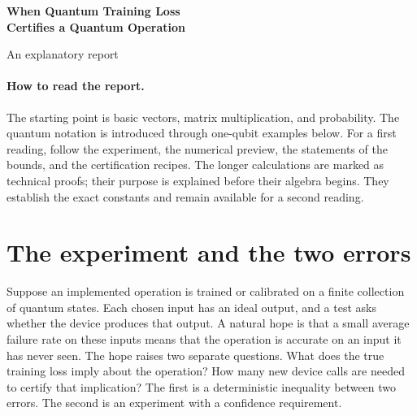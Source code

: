 \documentclass[11pt,a4paper]{article}
\numberwithin{equation}{section}
\begin{document}
\begin{center}
{\LARGE\bfseries\color{ink} When Quantum Training Loss\\[3pt] Certifies a Quantum Operation}\par
\vspace{5pt}
{\large An explanatory report}
\end{center}
\vspace{3pt}
\begin{abstract}
A suitable finite collection of test inputs can force a perfectly agreeing quantum channel to equal a unitary target. A small nonzero loss on those same inputs may nevertheless give a weak accuracy guarantee. The missing distinction is sensitivity to dissipative errors. This report develops a geometric criterion for when pure-state training loss controls average error linearly, derives its optimal coefficient, and explains the precision cost of menus that fail the criterion. The same geometry determines an optimal certification law even when the verifier chooses later probes adaptively and stores outputs in quantum memory. An independent-channel example makes the consequence explicit: adding a third global product input changes the required number of examples from order $n/\delta^2$ to order $1/\delta$, at fixed confidence, for an array of $n$ qubits and a requested average-error threshold $\delta$. Exact physical assumptions and the cost of each example remain part of the statement.
\end{abstract}

\paragraph{How to read the report.}
The starting point is basic vectors, matrix multiplication, and probability.
The quantum notation is introduced through one-qubit examples below.
For a first reading, follow the experiment, the numerical preview, the
statements of the bounds, and the certification recipes. The longer
calculations are marked as technical proofs; their purpose is explained
before their algebra begins. They establish the exact constants and remain
available for a second reading.

\section{The experiment and the two errors}
\label{sec:experiment}

Suppose an implemented operation is trained or calibrated on a finite collection of quantum states. Each chosen input has an ideal output, and a test asks whether the device produces that output. A natural hope is that a small average failure rate on these inputs means that the operation is accurate on an input it has never seen. The hope raises two separate questions. What does the true training loss imply about the operation? How many new device calls are needed to certify that implication? The first is a deterministic inequality between two errors. The second is an experiment with a confidence requirement.
\end{document}
